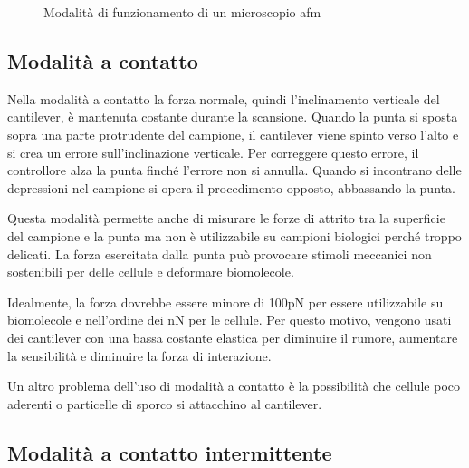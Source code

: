\documentclass[../main.tex]{subfiles}
\begin{document}
\begin{figure}[h]
\begin{subfigure}{0.32\linewidth}
\end{subfigure}
\caption{Modalità di funzionamento di un microscopio \acrshort{afm}}
\label{fig:afm_modes}
\end{figure}

\subsection{Modalità a contatto}

Nella modalità a contatto la forza normale, quindi l'inclinamento verticale del cantilever, è mantenuta costante durante la scansione. Quando la punta si sposta sopra una parte protrudente del campione, il cantilever viene spinto verso l'alto e si crea un errore sull'inclinazione verticale. Per correggere questo errore, il controllore alza la punta finché l'errore non si annulla. Quando si incontrano delle depressioni nel campione si opera il procedimento opposto, abbassando la punta.

Questa modalità permette anche di misurare le forze di attrito tra la superficie del campione e la punta ma non è utilizzabile su campioni biologici perché troppo delicati. La forza esercitata dalla punta può provocare stimoli meccanici non sostenibili per delle cellule e deformare biomolecole.\cite{zhong_1993}

Idealmente, la forza dovrebbe essere minore di 100pN per essere utilizzabile su biomolecole e nell'ordine dei nN per le cellule. Per questo motivo, vengono usati dei cantilever con una bassa costante elastica per diminuire il rumore, aumentare la sensibilità e diminuire la forza di interazione.\cite{wang_2018}

Un altro problema dell'uso di modalità a contatto è la possibilità che cellule poco aderenti o particelle di sporco si attacchino al cantilever.

\subsection{Modalità a contatto intermittente}
\end{document}
